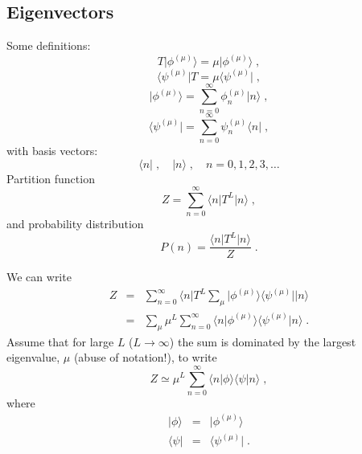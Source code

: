 \documentclass[a4paper,10pt]{article}
\newcommand{\bra}[1]{\langle #1 \vert}
\newcommand{\ket}[1]{\vert #1 \rangle}
\newcommand{\braket}[2]{\langle #1 \vert #2 \rangle}
\begin{document}
\subsection{Eigenvectors}

Some definitions:
\begin{equation}
 T \ket{\phi^{(\mu)}} = \mu \ket{\phi^{(\mu)}} \;, 
\end{equation}
\begin{equation}
 \bra{\psi^{(\mu)}} T = \mu \bra{\psi^{(\mu)}} \;, 
\end{equation}
\begin{equation}
 \ket{\phi^{(\mu)}} = \sum_{n=0}^\infty \phi_n^{(\mu)} \ket{n} \;, 
\end{equation}
\begin{equation}
 \bra{\psi^{(\mu)}} = \sum_{n=0}^\infty \psi_n^{(\mu)} \bra{n} \;,
\end{equation}
with basis vectors:
\begin{equation}
  \bra{n} \;, \quad \ket{n} \;, \quad n = 0,1,2,3,\ldots 
\end{equation}
Partition function
\begin{equation}
  Z = \sum_{n=0}^\infty \bra{n} T^L \ket{n} \;, 
\end{equation}
and probability distribution
\begin{equation}
  P(n) = \frac{ \bra{n} T^L \ket{n} }{Z} \;.
\end{equation}

We can write
\begin{eqnarray}
 Z &=& \sum_{n=0}^\infty \bra{n} T^L \sum_{\mu} \ket{\phi^{(\mu)}}\bra{\psi^{(\mu)}} \ket{n} \nonumber \\
   &=& \sum_{\mu}\mu^L \sum_{n=0}^\infty \braket{n}{\phi^{(\mu)}}\braket{\psi^{(\mu)}}{n} \;.
\end{eqnarray}
Assume that for large $L$ ($L\to\infty$) the sum is dominated by the largest eigenvalue, $\mu$ (abuse of notation!), to write
\begin{equation}
 Z \simeq \mu^L \sum_{n=0}^\infty \braket{n}{\phi}\braket{\psi}{n} \;,
\end{equation}
where
\begin{eqnarray}
  \ket{\phi} &=& \ket{\phi^{(\mu)}} \nonumber \\
  \bra{\psi} &=& \bra{\psi^{(\mu)}} \;.
\end{eqnarray}
\end{document}
